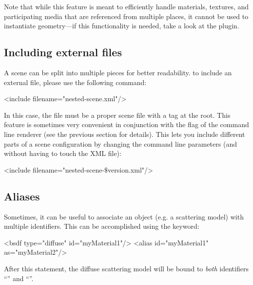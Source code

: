 Note that while this feature is meant to efficiently handle materials,
textures, and participating media that are referenced from multiple places,
it cannot be used to instantiate geometry---if this functionality is needed,
take a look at the  plugin.

\subsection{Including external files}
A scene can be split into multiple pieces for better readability.
to include an external file, please use the following command:
\begin{xml}
<include filename="nested-scene.xml"/>
\end{xml}
In this case, the file  must be a proper scene file with a  tag at the root.
This feature is sometimes very convenient in conjunction with the  flag of the  command line renderer (see the previous section for details).
This lets you include different parts of a scene configuration by changing the command line parameters (and without having to touch the XML file):
\begin{xml}
<include filename="nested-scene-$\texttt{\$}$version.xml"/>
\end{xml}
\subsection{Aliases}
Sometimes, it can be useful to associate an object (e.g. a scattering model)
with multiple identifiers. This can be accomplished using the  keyword:
\begin{xml}
	<bsdf type="diffuse" id="myMaterial1"/>
	<alias id="myMaterial1" as="myMaterial2"/>
\end{xml}
After this statement, the diffuse scattering model will be bound to
\emph{both} identifiers ``'' and ``''.
